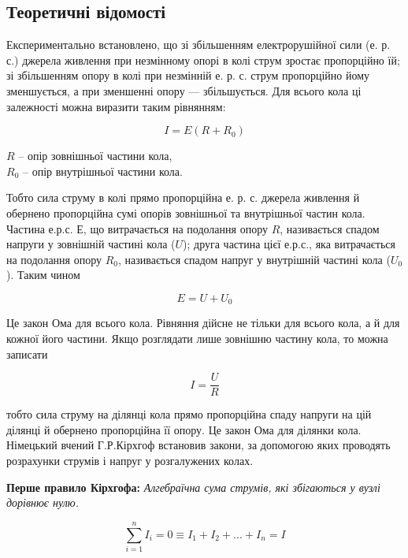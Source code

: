 \documentclass{article}
\begin{document}
\begin{normalsize}
	\section*{Теоретичні відомості}
	Експериментально встановлено, що зі збільшенням електрорушійної сили
	(е. р. с.) джерела живлення при незмінному опорі в колі струм зростає
	пропорційно їй; зі збільшенням опору в колі при незмінній е. р. с. струм
	пропорційно йому зменшується, а при зменшенні опору — збільшується. Для
	всього кола ці залежності можна виразити таким рівнянням:
	
	\begin{equation}
		I = E(R+R_0)\nonumber
	\end{equation}
	\begin{flushright}
		$R$ – опір зовнішньої частини кола,\\ $R_0$ – опір внутрішньої частини кола.
	\end{flushright}

	Тобто сила струму в колі прямо пропорційна е. р. с. джерела живлення й
	обернено пропорційна сумі опорів зовнішньої та внутрішньої частин кола.
	Частина е.р.с. $Е$, що витрачається на подолання опору $R$, називається спадом
	напруги у зовнішній частині кола ($U$); друга частина цієї е.р.с., яка витрачається
	на подолання опору $R_0$, називається спадом напруг у внутрішній частині кола
	($U_0$). Таким чином
	
	\begin{equation}
		E = U + U_0 \nonumber
	\end{equation}

	Це закон Ома для всього кола. Рівняння дійсне не тільки для всього кола, а
	й для кожної його частини. Якщо розглядати лише зовнішню частину кола, то
	можна записати
	
	\begin{equation}
		I = \frac{U}{R} \nonumber
	\end{equation}

	тобто сила струму на ділянці кола прямо пропорційна спаду напруги на цій
	ділянці й обернено пропорційна її опору. Це закон Ома для ділянки кола.
	Німецький вчений Г.Р.Кірхгоф встановив закони, за допомогою яких проводять
	розрахунки струмів і напруг у розгалужених колах.
	
	\textbf{Перше правило Кірхгофа:} \textit{Алгебраїчна сума струмів, які збігаються у вузлі
	дорівнює нулю.}
	
	\begin{equation}
		\sum_{i=1}^{n}I_i=0 \equiv I_1 + I_2 + ... + I_n = I \nonumber
	\end{equation}


\end{normalsize}
\end{document}
